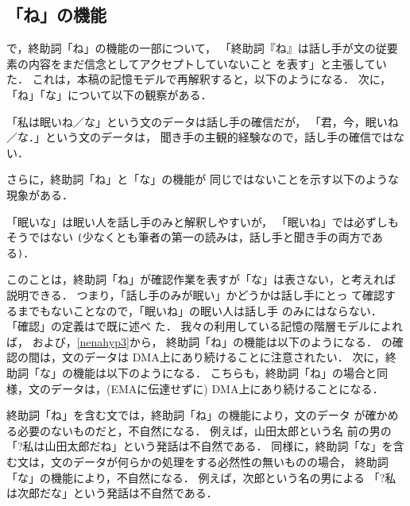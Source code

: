 \subsection{「ね」の機能}\label{semnena}
\cite{katagiri93}で，終助詞「ね」の機能の一部について，
「終助詞『ね』は話し手が文の従要素の内容をまだ信念としてアクセプトしていないこと
を表す」と主張していた．
これは，本稿の記憶モデルで再解釈すると，以下のようになる．
次に，「ね」「な」について以下の観察がある．
\begin{obserb}\label{nenahyp2}
「私は眠い{\dg ね}／{\dg な}」という文のデータは話し手の確信だが，
「君，今，眠い{\dg ね}／{\dg な}．」という文のデータは，
聞き手の主観的経験なので，話し手の確信ではない．
\end{obserb}
さらに，終助詞「ね」と「な」の機能が
同じではないことを示す以下のような現象がある．
\begin{obserb}\label{nenahyp3}
「眠い{\dg な}」は眠い人を話し手{\dg のみ}と解釈しやすいが，
「眠い{\dg ね}」では必ずしもそうではない
\verb+(+少なくとも筆者の第一の読みは，話し手と聞き手の両方である\verb+)+．
\end{obserb}
このことは，終助詞「ね」が確認作業を表すが「な」は表さない，と考えれば
説明できる．  つまり，「話し手{\dg のみ}が眠い」かどうかは話し手にとっ
て確認するまでもないことなので，「眠い{\dg ね}」の眠い人は話し手
{\dg のみ}にはならない．  「確認」の定義はで既に述べ
た．  我々の利用している記憶の階層モデルによれば，
および，\ref{nenahyp3}から，
終助詞「ね」の機能は以下のようになる．
の確認の間は，文のデータは DMA上にあり続けることに注意されたい．
次に，終助詞「な」の機能は以下のようになる．
こちらも，終助詞「ね」の場合と同様，文のデータは，(EMAに伝達せずに)
DMA上にあり続けることになる．

終助詞「ね」を含む文では，終助詞「ね」の機能により，文のデータ
が確かめる必要のないものだと，不自然になる． 例えば，山田太郎という名
前の男の「?私は山田太郎だ{\dg ね}」という発話は不自然である． 
同様に，終助詞「な」を含む文は，文のデータが何らかの処理をする必然性の無いものの場合，
終助詞「な」の機能により，不自然になる． 例えば，次郎という名の男による
「?私は次郎だ{\dg な}」という発話は不自然である． 

